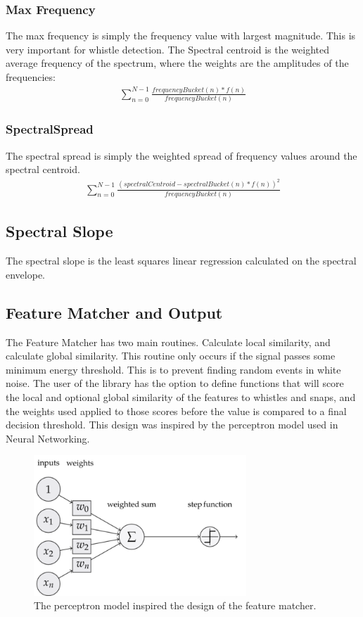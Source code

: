 \documentclass[DIV=calc, paper=a4, fontsize=11pt, twocolumn]{scrartcl}   %
\begin{document}
   \subsubsection{Max Frequency}
   The max frequency is simply the frequency value with largest magnitude. This is very important for whistle detection.
   The Spectral centroid is the weighted average frequency of the spectrum, where the weights are the amplitudes of the frequencies:
   \begin{align}
      \sum_{n=0}^{N-1} \frac{frequencyBucket(n)*f(n)}{frequencyBucket(n)}
   \end{align}
    \subsubsection{SpectralSpread}
    The spectral spread is simply the weighted spread of frequency values around the spectral centroid.
     \begin{align}
    \sum_{n=0}^{N-1} \frac{(spectralCentroid-spectralBucket(n)*f(n))^2}{frequencyBucket(n)}
    \end{align}
\subsection{Spectral Slope}
   The spectral slope is the least squares linear regression calculated on the spectral envelope.



\subsection{Feature Matcher and Output}
The Feature Matcher has two main routines. Calculate local similarity, and calculate global similarity. This routine only occurs if the signal passes some minimum energy threshold. This is to prevent finding random events in white noise. The user of the library has the option to define functions that will score the local and optional global similarity of the features to whistles and snaps, and the weights used applied to those scores before the value is compared to a final decision threshold. This design was inspired by the perceptron model used in Neural Networking.


\begin{figure}[h]
   \centering
   \includegraphics[width=80mm]{figures/perceptronmodel.png}
   \caption{The perceptron model inspired the design of the feature matcher.}
   \label{overflow}
\end{figure}
\end{document}
